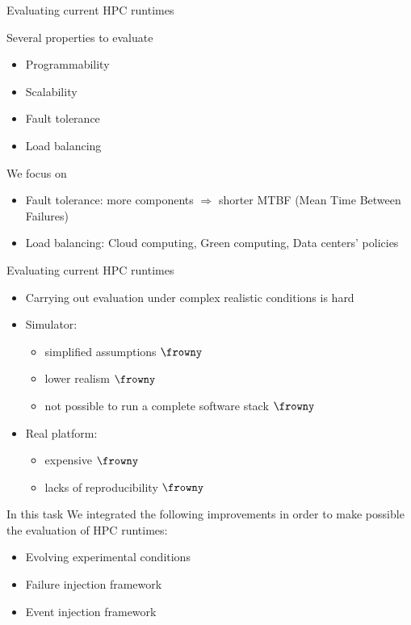 \documentclass[11pt,xcolor=dvipsnames,presentation]{beamer}
\begin{document}
\begin{frame}[label=sec-4-0-2]{Evaluating current HPC runtimes}
\begin{block}{Several properties to evaluate}
\begin{itemize}
\item Programmability
\item Scalability
\item \alert{Fault tolerance}
\item \alert{Load balancing}
\end{itemize}
\end{block}

\begin{block}{We focus on}
\begin{itemize}
\item Fault tolerance:
more components $\Rightarrow$ shorter MTBF \newline
(Mean Time Between Failures)

\item Load balancing: Cloud computing, Green computing, \newline
  Data centers' policies
\end{itemize}
\end{block}
\end{frame}


\begin{frame}[label=sec-4-0-3]{Evaluating current HPC runtimes}
\begin{itemize}
\item Carrying out evaluation under complex realistic conditions is \alert{hard}
\item Simulator:
\begin{itemize}
\item simplified assumptions $\frowny$
\item lower realism $\frowny$
\item not possible to run a complete software stack $\frowny$
\end{itemize}

\item Real platform:
\begin{itemize}
\item expensive $\frowny$
\item lacks of reproducibility $\frowny$
\end{itemize}
\end{itemize}
\end{frame}


\begin{frame}[label=sec-4-0-4]{In this task}
We integrated the following improvements in order to
make possible the evaluation of HPC runtimes:

\begin{itemize}
\item Evolving experimental conditions
\item Failure injection framework
\item Event injection framework
\end{itemize}
\end{frame}
\end{document}
